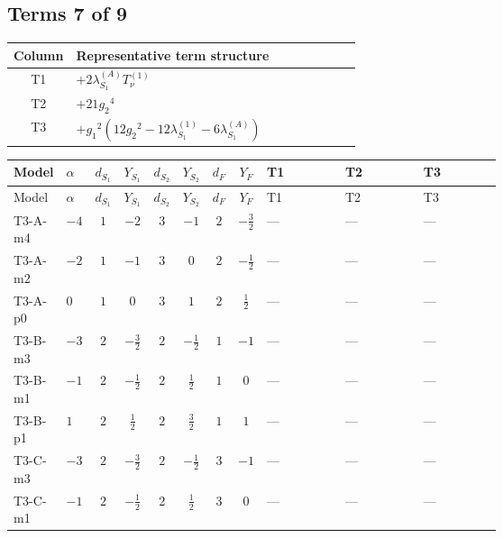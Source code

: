 \documentclass[8pt]{article}
\begin{document}
\begin{landscape}
\subsection*{Terms 7 of 9}
\begin{center}
\begin{tabular}{@{}c >{\raggedright\arraybackslash}p{0.82\linewidth}@{}}
\toprule
Column & Representative term structure \\
\midrule
T1 & \(\displaystyle +2 {\lambda_{S_1}^{(A)}} T_{\nu}^{(1)}\) \\
\midrule
T2 & \(\displaystyle +21 {g_2}^4\) \\
\midrule
T3 & \(\displaystyle +{g_1}^2 \left(12 {g_2}^2-12 {\lambda_{S_1}^{(1)}}-6 {\lambda_{S_1}^{(A)}}\right)\) \\
\midrule
\bottomrule
\end{tabular}
\end{center}
\smallskip
\tiny
\begin{longtable}{@{}llcccccc >{\raggedright\arraybackslash}p{0.21\linewidth} >{\raggedright\arraybackslash}p{0.21\linewidth} >{\raggedright\arraybackslash}p{0.21\linewidth}@{}}
\toprule
Model & $\alpha$ & $d_{S_1}$ & $Y_{S_1}$ & $d_{S_2}$ & $Y_{S_2}$ & $d_F$ & $Y_F$ & T1 & T2 & T3 \\
\midrule
\endfirsthead
\toprule
Model & $\alpha$ & $d_{S_1}$ & $Y_{S_1}$ & $d_{S_2}$ & $Y_{S_2}$ & $d_F$ & $Y_F$ & T1 & T2 & T3 \\
\midrule
\endhead
T3-A-m4 & $-4$ & $1$ & $-2$ & $3$ & $-1$ & $2$ & $-\frac{3}{2}$ & --- & --- & --- \\
\midrule
T3-A-m2 & $-2$ & $1$ & $-1$ & $3$ & $0$ & $2$ & $-\frac{1}{2}$ & --- & --- & --- \\
\midrule
T3-A-p0 & $0$ & $1$ & $0$ & $3$ & $1$ & $2$ & $\frac{1}{2}$ & --- & --- & --- \\
\midrule
T3-B-m3 & $-3$ & $2$ & $-\frac{3}{2}$ & $2$ & $-\frac{1}{2}$ & $1$ & $-1$ & --- & --- & --- \\
\midrule
T3-B-m1 & $-1$ & $2$ & $-\frac{1}{2}$ & $2$ & $\frac{1}{2}$ & $1$ & $0$ & --- & --- & --- \\
\midrule
T3-B-p1 & $1$ & $2$ & $\frac{1}{2}$ & $2$ & $\frac{3}{2}$ & $1$ & $1$ & --- & --- & --- \\
\midrule
T3-C-m3 & $-3$ & $2$ & $-\frac{3}{2}$ & $2$ & $-\frac{1}{2}$ & $3$ & $-1$ & --- & --- & --- \\
\midrule
T3-C-m1 & $-1$ & $2$ & $-\frac{1}{2}$ & $2$ & $\frac{1}{2}$ & $3$ & $0$ & --- & --- & --- \\

\end{longtable}
\end{landscape}
\end{document}
